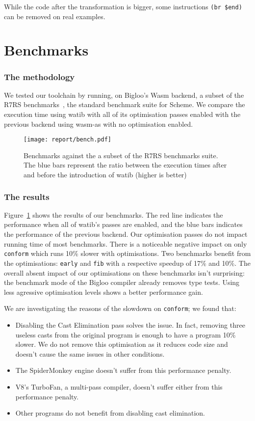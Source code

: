 \documentclass[a4paper,11pt]{article}
\begin{document}
While the code after the transformation is bigger, some instructions \texttt{(br
  \$end)} can be removed on real examples.

\section{Benchmarks}\label{bench}
\subsubsection{The methodology}
We tested our toolchain by running, on Bigloo's Wasm backend, a subset of the
R7RS benchmarks~\cite{r7rsbench}, the standard benchmark suite for Scheme. We
compare the execution time using \textsf{watib} with all of its optimisation
passes enabled with the previous backend using \textsf{wasm-as} with no
optimisation enabled.
\begin{figure}[h!]
  \texttt{[image: report/bench.pdf]}
  \caption{Benchmarks against the a subset of the R7RS benchmarks suite. The
    blue bars represent the ratio between the execution times after and before
    the introduction of \textsf{watib} (higher is better)}\label{r7rs}
\end{figure}
\subsubsection{The results}
Figure~\ref{r7rs} shows the results of our benchmarks. The red line indicates
the performance when all of \textsf{watib}'s passes are enabled, and the blue
bars indicates the performance of the previous backend. Our optimisation passes
do not impact running time of most benchmarks. There is a noticeable negative
impact on only \texttt{conform} which runs 10\% slower with optimisations. Two
benchmarks benefit from the optimisations: \texttt{early} and \texttt{fib} with
a respective speedup of 17\% and 10\%. The overall absent impact of our
optimisations on these benchmarks isn't surprising: the benchmark mode of the
Bigloo compiler already removes type tests. Using less agressive optimisation
levels shows a better performance gain.

We are investigating the reasons of the slowdown on \texttt{conform}; we found
that:
\begin{itemize}
  \item Disabling the Cast Elimination pass solves the issue. In fact, removing
    three useless casts from the original program is enough to have a program
    10\% slower. We do not remove this optimisation as it reduces code size and
    doesn't cause the same issues in other conditions.
  \item The SpiderMonkey engine doesn't suffer from this performance penalty.
  \item V8's TurboFan, a multi-pass compiler, doesn't suffer either from this
    performance penalty.
  \item Other programs do not benefit from disabling cast elimination.
\end{itemize}
\end{document}
